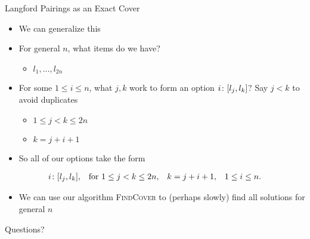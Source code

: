 \documentclass[aspectratio=169, handout]{beamer}
\begin{document}
\begin{frame}{Langford Pairings as an Exact Cover}
    \begin{itemize}
        \item We can generalize this
        \item For general $n$, what items do we have? \pause
        \begin{itemize}
            \item $l_1, \ldots, l_{2n}$
        \end{itemize}
        \item For some $1 \leq i \leq n$, what $j, k$ work to form an option $i\colon \bqty{l_j, l_k}$? Say $j < k$ to avoid duplicates \pause
        \begin{itemize}
            \item $1 \leq j < k \leq 2n$ \pause
            \item $k = j + i + 1$ 
        \end{itemize}
        \item So all of our options take the form
    \end{itemize}
    \begin{align*}
        i\colon \bqty{l_j, l_k}, & & \text{for } 1 \leq j < k \leq 2n, & & k = j + i + 1, & & 1 \leq i \leq n.
    \end{align*}
    \begin{itemize}
        \item We can use our algorithm \textsc{FindCover} to (perhaps slowly) find all solutions for general $n$
    \end{itemize}
\end{frame}

\begin{frame}{}
      \begin{center}
    {\color{sigma@mainblue} \LARGE Questions?}
  \end{center}
\end{frame}
\end{document}
